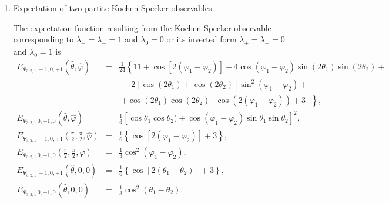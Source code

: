 \documentclass[pra,amsfonts,showpacs,showkeys,preprint]{revtex4}
\begin{document}
\begin{enumerate}
\item{Expectation of two-partite Kochen-Specker observables}

The expectation function resulting from the Kochen-Specker observable corresponding to
$\lambda_+ = \lambda_- = 1$ and $\lambda_0 = 0$ or its inverted form
$\lambda_+ = \lambda_- = 0$ and $\lambda_0 = 1$
is
\begin{equation}
\begin{array}{rcl}
E_{{ \Psi_{3,2,1}}\,+1, 0, +1 } ({\hat \theta},{\hat \varphi} )&=&
\frac{1}{24} \left\{
11
+\cos [2 (\varphi_1-\varphi_2)]
+4 \cos (\varphi_1-\varphi_2) \sin (2  \theta_1 ) \sin (2  \theta_2 ) +  \right.
\\
&&\;
+2 \left[\cos (2  \theta_1 )+\cos (2 \theta_2) \right] \sin ^2(\varphi_1-\varphi_2)+
\\
&&\; \left.
+\cos (2  \theta_1 )   \cos (2  \theta_2 ) \left[ \cos (2 (\varphi_1-\varphi_2))+3\right]\right\},
\\
E_{{ \Psi_{3,2,1}}\, 0, +1, 0 } ({\hat \theta},{\hat \varphi} )&=&
\frac{1}{3} \left[\cos \theta_1  \cos \theta_2)+\cos    (\varphi_1-\varphi_2) \sin  \theta_1  \sin  \theta_2 \right]^2 ,
\\
E_{{ \Psi_{3,2,1}}\,+1, 0, +1 } (\frac{\pi}{2},\frac{\pi}{2},{\hat \varphi} )&=&
\frac{1}{6} \left\{\cos \left[2 (\varphi_1-\varphi_2)\right]+3\right\},
\\
E_{{ \Psi_{3,2,1}}\, 0, +1, 0 } (\frac{\pi}{2},\frac{\pi}{2},{\hat \varphi} )&=&
\frac{1}{3} \cos ^2(\varphi_1-\varphi_2),
\\
E_{{ \Psi_{3,2,1}}\,+1, 0, +1 } ({\hat \theta},0,0 )&=&
\frac{1}{6} \left\{\cos \left[2 ( \theta_1 - \theta_2 )\right]+3\right\},
\\
E_{{ \Psi_{3,2,1}}\, 0, +1, 0 } ({\hat \theta},0,0 )&=&
\frac{1}{3} \cos ^2( \theta_1 - \theta_2 ).
\end{array}
\label{2009-gtq-edosgc3ks}
\end{equation}

\end{enumerate}
\end{document}
